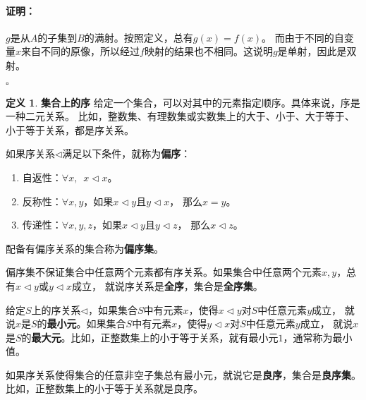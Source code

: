 \documentclass[12pt,UTF8]{ctexbook}
\theoremstyle{definition}
\newtheorem{df}{定义}[section]
\theoremstyle{plain}
\renewenvironment{proof}{\paragraph{\textbf{证明：}}}{\hfill$\square$}
\begin{document}
\begin{appendix}
\begin{proof}
    $g$是从$A$的子集到$B$的满射。按照定义，总有$g(x) = f(x)$。
    而由于不同的自变量$x$来自不同的原像，所以经过$f$映射的结果也不相同。这说明$g$是单射，因此是双射。

\end{proof}

\begin{df}{\textbf{集合上的序}}
    给定一个集合，可以对其中的元素指定顺序。具体来说，序是一种二元关系。
    比如，整数集、有理数集或实数集上的大于、小于、大于等于、小于等于关系，都是序关系。

    如果序关系$\triangleleft$满足以下条件，就称为\textbf{偏序}：
    \begin{enumerate}
        \item 自返性：$\forall x, \,\,\, x \triangleleft x$。
        \item 反称性：$\forall x, y$，如果$x \triangleleft y$且$y \triangleleft x$， 那么$x = y$。
        \item 传递性：$\forall x, y, z$，如果$x \triangleleft y$且$y \triangleleft z$， 那么$x \triangleleft z$。
    \end{enumerate}
    配备有偏序关系的集合称为\textbf{偏序集}。

    偏序集不保证集合中任意两个元素都有序关系。如果集合中任意两个元素$x, y$，总有$x \triangleleft y$或$y \triangleleft x$成立，
    就说序关系是\textbf{全序}，集合是\textbf{全序集}。

    给定$S$上的序关系$\triangleleft$，如果集合$S$中有元素$x$，使得$x \triangleleft y$对$S$中任意元素$y$成立，
    就说$x$是$S$的\textbf{最小元}。如果集合$S$中有元素$x$，使得$y \triangleleft x$对$S$中任意元素$y$成立，
    就说$x$是$S$的\textbf{最大元}。比如，正整数集上的小于等于关系，就有最小元$1$，通常称为最小值。
    
    如果序关系使得集合的任意非空子集总有最小元，就说它是\textbf{良序}，集合是\textbf{良序集}。
    比如，正整数集上的小于等于关系就是良序。


\end{df}


\end{appendix}
\end{document}
